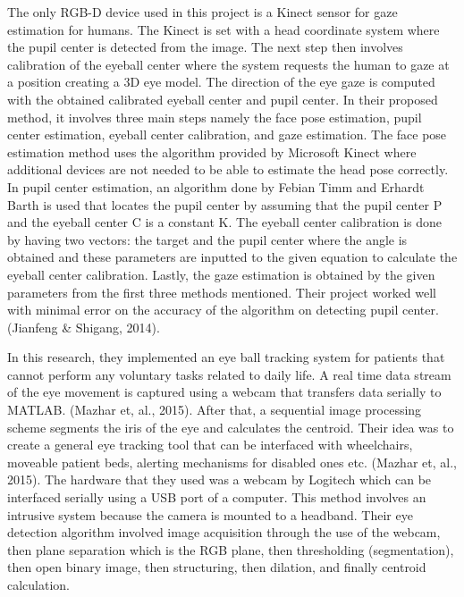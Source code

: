 The only RGB-D device used in this project is a Kinect sensor for gaze estimation for humans. The Kinect is set with a head coordinate system where the pupil center is detected from the image. The next step then involves calibration of the eyeball center where the system requests the human to gaze at a position creating a 3D eye model. The direction of the eye gaze is computed with the obtained calibrated eyeball center and pupil center. In their proposed method, it involves three main steps namely the face pose estimation, pupil center estimation, eyeball center calibration, and gaze estimation. The face pose estimation method uses the algorithm provided by Microsoft Kinect where additional devices are not needed to be able to estimate the head pose correctly. In pupil center estimation, an algorithm done by Febian Timm and Erhardt Barth is used that locates the pupil center by assuming that the pupil center P and the eyeball center C is a constant K. The eyeball center calibration is done by having two vectors: the target and the pupil center where the angle is obtained and these parameters are inputted to the given equation to calculate the eyeball center calibration. Lastly, the gaze estimation is obtained by the given parameters from the first three methods mentioned. Their project worked well with minimal error on the accuracy of the algorithm on detecting pupil center. (Jianfeng \& Shigang, 2014).
\newline

In this research, they implemented an eye ball tracking system for patients that cannot perform any voluntary tasks related to daily life. A real time data stream of the eye movement is captured using a webcam that transfers data serially to MATLAB. (Mazhar et, al., 2015). After that, a sequential image processing scheme segments the iris of the eye and calculates the centroid. Their idea was to create a general eye tracking tool that can be interfaced with wheelchairs, moveable patient beds, alerting mechanisms for disabled ones etc. (Mazhar et, al., 2015). The hardware that they used was a webcam by Logitech which can be interfaced serially using a USB port of a computer. This method involves an intrusive system because the camera is mounted to a headband. Their eye detection algorithm involved image acquisition through the use of the webcam, then plane separation which is the RGB plane, then thresholding (segmentation), then open binary image, then structuring, then dilation, and finally centroid calculation.

